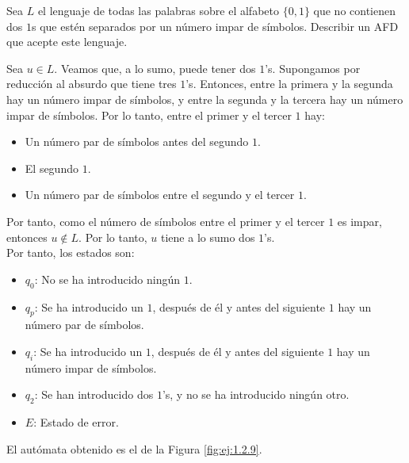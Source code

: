\begin{ejercicio} \label{ej:1.2.9}
    Sea $L$ el lenguaje de todas las palabras sobre el alfabeto $\{0, 1\}$ que no contienen dos $1$s que estén separados por un número impar de símbolos. Describir un AFD que acepte este lenguaje.

    Sea $u\in L$. Veamos que, a lo sumo, puede tener dos $1$'s. Supongamos por reducción al absurdo que tiene tres $1$'s. Entonces, entre la primera y la segunda hay un número impar de símbolos, y entre la segunda y la tercera hay un número impar de símbolos. Por lo tanto, entre el primer y el tercer $1$ hay:
    \begin{itemize}
        \item Un número par de símbolos antes del segundo $1$.
        \item El segundo $1$.
        \item Un número par de símbolos entre el segundo y el tercer $1$.
    \end{itemize}
    Por tanto, como el número de símbolos entre el primer y el tercer $1$ es impar, entonces $u\notin L$. Por lo tanto, $u$ tiene a lo sumo dos $1$'s.\\

    Por tanto, los estados son:
    \begin{itemize}
        \item $q_0$: No se ha introducido ningún $1$.
        \item $q_{p}$: Se ha introducido un $1$, después de él y antes del siguiente $1$ hay un número par de símbolos.
        \item $q_{i}$: Se ha introducido un $1$, después de él y antes del siguiente $1$ hay un número impar de símbolos.
        \item $q_{2}$: Se han introducido dos $1$'s, y no se ha introducido ningún otro.
        \item $E$: Estado de error.
    \end{itemize}

    El autómata obtenido es el de la Figura \ref{fig:ej:1.2.9}.
    \begin{figure}
        \centering
\end{figure}
\end{ejercicio}
